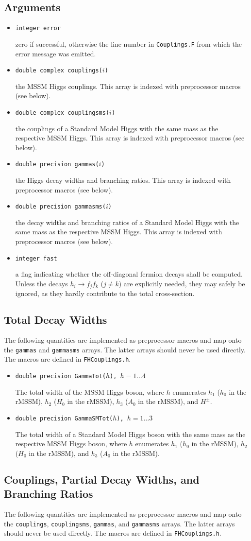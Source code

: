 \documentclass[12pt,a4paper]{report}
\newcommand{\CODE}[1]{\texttt{#1}}
\newcommand{\VAROUT}[1]{%
  \item[\fbox{\scriptsize\textsc{out}}]
  \CODE{#1}\par}
\newcommand{\MACRO}[1]{\item
  \CODE{#1}\par}
\newcommand{\ARGUMENTS}{\subsection*{Arguments}\begin{itemize}}
\newcommand{\ENDARGUMENTS}{\end{itemize}}
\newcommand{\DETAILS}[1]{\subsection*{#1}}
\newcommand{\BEGINDETAILS}{\begin{itemize}}
\newcommand{\ENDDETAILS}{\end{itemize}}
\begin{document}
\ARGUMENTS

\VAROUT{integer error}
zero if successful, otherwise the line number in \CODE{Couplings.F} from 
which the error message was emitted.

\VAROUT{double complex couplings($i$)}
the MSSM Higgs couplings.  This array is indexed with preprocessor 
macros (see below).

\VAROUT{double complex couplingsms($i$)}
the couplings of a Standard Model Higgs with the same mass as the 
respective MSSM Higgs.  This array is indexed with preprocessor macros 
(see below).

\VAROUT{double precision gammas($i$)}
the Higgs decay widths and branching ratios.  This array is indexed with
preprocessor macros (see below).

\VAROUT{double precision gammasms($i$)}
the decay widths and branching ratios of a Standard Model Higgs with the
same mass as the respective MSSM Higgs.  This array is indexed with
preprocessor macros (see below).

\VAROUT{integer fast}
a flag indicating whether the off-diagonal fermion decays shall be
computed.  Unless the decays $h_i\to f_j f_k$ ($j \neq k$) are explicitly
needed, they may safely be ignored, as they hardly contribute to the
total cross-section.

\ENDARGUMENTS

\DETAILS{Total Decay Widths}

The following quantities are implemented as preprocessor macros and map
onto the \CODE{gammas} and \CODE{gammasms} arrays.  The latter arrays
should never be used directly.  The macros are defined in
\CODE{FHCouplings.h}.

\BEGINDETAILS

\MACRO{double precision GammaTot($h$), $h = 1\dots 4$}
The total width of the MSSM Higgs boson, where $h$ enumerates
$h_1$ ($h_0$ in the rMSSM), $h_2$ ($H_0$ in the rMSSM), $h_3$ ($A_0$ in 
the rMSSM), and $H^\pm$.

\MACRO{double precision GammaSMTot($h$), $h = 1\dots 3$}
The total width of a Standard Model Higgs boson with the same mass as
the respective MSSM Higgs boson, where $h$ enumerates $h_1$ ($h_0$ in
the rMSSM), $h_2$ ($H_0$ in the rMSSM), and $h_3$ ($A_0$ in the rMSSM).

\ENDDETAILS

\DETAILS{Couplings, Partial Decay Widths, and Branching Ratios}

The following quantities are implemented as preprocessor macros and map
onto the \CODE{couplings}, \CODE{couplingsms}, \CODE{gammas}, and
\CODE{gammasms} arrays.  The latter arrays should never be used
directly.  The macros are defined in \CODE{FHCouplings.h}.
\end{document}
